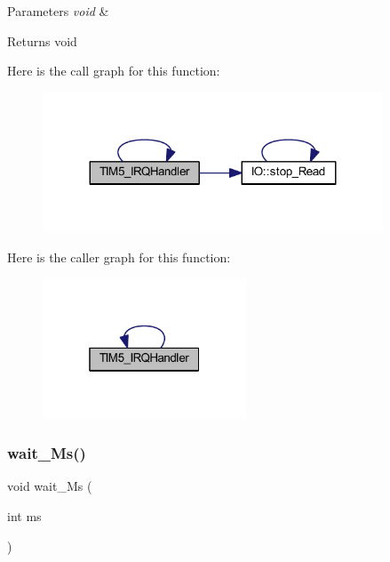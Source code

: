 \begin{DoxyParams}{Parameters}
{\em void} & \\
\hline
\end{DoxyParams}
\begin{DoxyReturn}{Returns}
void 
\end{DoxyReturn}
Here is the call graph for this function\+:\nopagebreak
\begin{figure}[H]
\begin{center}
\leavevmode
\includegraphics[width=287pt]{namespace_l_l_a5e66446caf21dd90191dc07a13ce2378_cgraph}
\end{center}
\end{figure}
Here is the caller graph for this function\+:\nopagebreak
\begin{figure}[H]
\begin{center}
\leavevmode
\includegraphics[width=172pt]{namespace_l_l_a5e66446caf21dd90191dc07a13ce2378_icgraph}
\end{center}
\end{figure}
\mbox{\label{namespace_l_l_ab30bdedb41438098df71bea7d5eb624d}} 
\subsubsection{\texorpdfstring{wait\+\_\+\+Ms()}{wait\_Ms()}}
{\footnotesize\ttfamily void wait\+\_\+\+Ms (\begin{DoxyParamCaption}\item[{int}]{ms }\end{DoxyParamCaption})}



